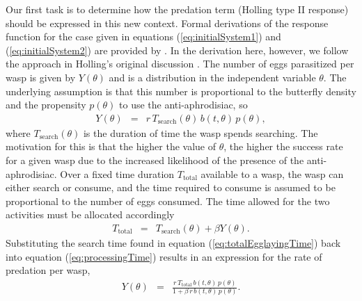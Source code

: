 \documentclass[review,authoryear]{elsarticle}
\newcommand{\origB}{{b}}
\newcommand{\origP}[1]{{p}(#1)}
\newcommand{\origTheta}{{\theta}}
\newcommand{\origT}{{t}}
\begin{document}
Our first task is to determine how the predation term (Holling type II response)
should be expressed in this new context. Formal derivations of the
response function for the case given in equations
(\ref{eq:initialSystem1}) and (\ref{eq:initialSystem2}) are provided
by \cite{DAWES201311}.  In the derivation here,
however, we follow the approach in Holling's original
discussion \citep{holling_1959A,holling_1959B}. The number of eggs parasitized per wasp is given by $Y(\origTheta)$ and is a distribution in the independent variable $\theta$.  The underlying assumption is that this number is proportional to the butterfly density and the propensity  $\origP{\origTheta}$ to use the anti-aphrodisiac, so
\begin{eqnarray}
  \label{eq:processingTime}
  Y(\origTheta) & = & r\, T_{\mathrm{search}}(\origTheta) \,\origB(\origT,\origTheta)\, \origP{\origTheta},
\end{eqnarray}
where $T_{\mathrm{search}}(\origTheta)$ is the duration of time the wasp spends searching. The motivation for this is
that the higher the value of $\origTheta$, the higher the success rate for
a given wasp due to the increased likelihood of the presence of the anti-aphrodisiac.   Over a fixed time duration $T_{\mathrm{total}}$  available to a wasp, the wasp can either search or consume, 
and the time required to consume is assumed to be proportional
to the number of eggs consumed. The time allowed for the two activities must be allocated accordingly
\begin{eqnarray}
  \label{eq:totalEgglayingTime}
  T_{\mathrm{total}} & = & T_{\mathrm{search}}(\origTheta) + \beta Y(\origTheta).
\end{eqnarray}
Substituting the search time found in equation
(\ref{eq:totalEgglayingTime}) back into equation
(\ref{eq:processingTime}) results in an expression for the rate of
predation per wasp,
\begin{eqnarray}
  \label{eq:waspPredationRate}
  Y(\origTheta) & = & \frac{r\, T_{\mathrm{total}}\, \origB(\origT,\origTheta)\, \origP{\origTheta}}{1 + \beta\, r \,\origB(\origT,\origTheta)\, \origP{\origTheta}}.
\end{eqnarray}
\end{document}

